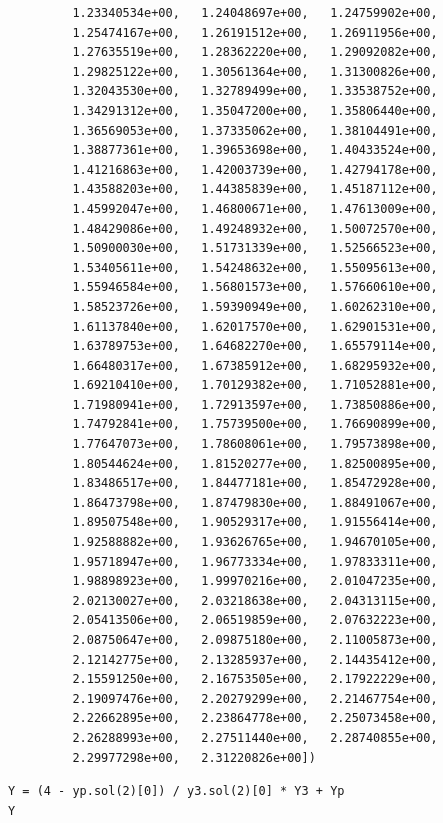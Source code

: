 \documentclass[11pt]{article}
\begin{document}
\begin{verbatim}
         1.23340534e+00,   1.24048697e+00,   1.24759902e+00,
         1.25474167e+00,   1.26191512e+00,   1.26911956e+00,
         1.27635519e+00,   1.28362220e+00,   1.29092082e+00,
         1.29825122e+00,   1.30561364e+00,   1.31300826e+00,
         1.32043530e+00,   1.32789499e+00,   1.33538752e+00,
         1.34291312e+00,   1.35047200e+00,   1.35806440e+00,
         1.36569053e+00,   1.37335062e+00,   1.38104491e+00,
         1.38877361e+00,   1.39653698e+00,   1.40433524e+00,
         1.41216863e+00,   1.42003739e+00,   1.42794178e+00,
         1.43588203e+00,   1.44385839e+00,   1.45187112e+00,
         1.45992047e+00,   1.46800671e+00,   1.47613009e+00,
         1.48429086e+00,   1.49248932e+00,   1.50072570e+00,
         1.50900030e+00,   1.51731339e+00,   1.52566523e+00,
         1.53405611e+00,   1.54248632e+00,   1.55095613e+00,
         1.55946584e+00,   1.56801573e+00,   1.57660610e+00,
         1.58523726e+00,   1.59390949e+00,   1.60262310e+00,
         1.61137840e+00,   1.62017570e+00,   1.62901531e+00,
         1.63789753e+00,   1.64682270e+00,   1.65579114e+00,
         1.66480317e+00,   1.67385912e+00,   1.68295932e+00,
         1.69210410e+00,   1.70129382e+00,   1.71052881e+00,
         1.71980941e+00,   1.72913597e+00,   1.73850886e+00,
         1.74792841e+00,   1.75739500e+00,   1.76690899e+00,
         1.77647073e+00,   1.78608061e+00,   1.79573898e+00,
         1.80544624e+00,   1.81520277e+00,   1.82500895e+00,
         1.83486517e+00,   1.84477181e+00,   1.85472928e+00,
         1.86473798e+00,   1.87479830e+00,   1.88491067e+00,
         1.89507548e+00,   1.90529317e+00,   1.91556414e+00,
         1.92588882e+00,   1.93626765e+00,   1.94670105e+00,
         1.95718947e+00,   1.96773334e+00,   1.97833311e+00,
         1.98898923e+00,   1.99970216e+00,   2.01047235e+00,
         2.02130027e+00,   2.03218638e+00,   2.04313115e+00,
         2.05413506e+00,   2.06519859e+00,   2.07632223e+00,
         2.08750647e+00,   2.09875180e+00,   2.11005873e+00,
         2.12142775e+00,   2.13285937e+00,   2.14435412e+00,
         2.15591250e+00,   2.16753505e+00,   2.17922229e+00,
         2.19097476e+00,   2.20279299e+00,   2.21467754e+00,
         2.22662895e+00,   2.23864778e+00,   2.25073458e+00,
         2.26288993e+00,   2.27511440e+00,   2.28740855e+00,
         2.29977298e+00,   2.31220826e+00])
\end{verbatim}

\begin{verbatim}
Y = (4 - yp.sol(2)[0]) / y3.sol(2)[0] * Y3 + Yp
Y
\end{verbatim}
\end{document}
